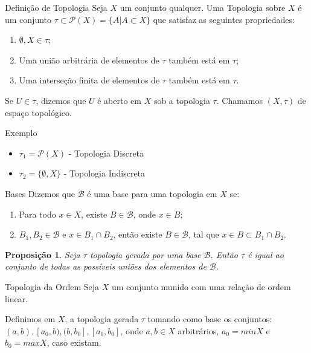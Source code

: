 \documentclass[aspectratio=169]{beamer}
\newtheorem{proposicao}[teo]{Proposição}
\begin{document}
	\begin{frame}{Definição de Topologia}
		Seja $X$ um conjunto qualquer. Uma Topologia sobre $X$ é um conjunto
		$\tau \subset \mathcal{P}(X) = \{A | A \subset X\}$ que satisfaz as seguintes propriedades:
		\begin{enumerate}
			\item $\emptyset, X \in \tau$;
			\item Uma união arbitrária de elementos de $\tau$ também está em $\tau$;
			\item Uma interseção finita de elementos de $\tau$ também está em $\tau$.
		\end{enumerate}
		
		Se $U \in \tau$, dizemos que $U$ é aberto em $X$ sob a topologia $\tau$.
		Chamamos $(X, \tau)$ de espaço topológico.
	\end{frame}
	
	\begin{frame}{Exemplo}
		\begin{itemize}
			\item $\tau_1 = \mathcal{P}(X)$ - Topologia Discreta
			\item $\tau_2 = \{\emptyset, X\}$ - Topologia Indiscreta
		\end{itemize}
	\end{frame}
	
	\begin{frame}{Bases}
		Dizemos que $\mathcal{B}$ é uma base para uma topologia em $X$ se:
		\begin{enumerate}
			\item Para todo $x \in X$, existe $B \in \mathcal{B}$, onde $x \in B$;
			\item $B_1, B_2 \in \mathcal{B}$ e $x \in B_1 \cap B_2$, então existe $B \in \mathcal{B}$, tal que $x \in B \subset B_1 \cap B_2$.
		\end{enumerate}
		
		\begin{proposicao}
			Seja $\tau$ topologia gerada por uma base $\mathcal{B}$. Então $\tau$ é igual ao conjunto de todas as possíveis uniões dos elementos de $\mathcal{B}$.
		\end{proposicao}
	\end{frame}
	
	\begin{frame}{Topologia da Ordem}
		Seja $X$ um conjunto munido com uma relação de ordem linear.
		
		Definimos em $X$, a topologia gerada $\tau$ tomando como base os conjuntos: $(a, b), [a_0, b), (b, b_0], [a_0, b_0]$, onde $a, b \in X$ arbitrários, $a_0 = minX$ e $b_0 = maxX$, caso existam.
	\end{frame}
	
\end{document}
